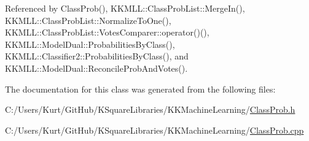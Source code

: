 Referenced by Class\+Prob(), K\+K\+M\+L\+L\+::\+Class\+Prob\+List\+::\+Merge\+In(), K\+K\+M\+L\+L\+::\+Class\+Prob\+List\+::\+Normalize\+To\+One(), K\+K\+M\+L\+L\+::\+Class\+Prob\+List\+::\+Votes\+Comparer\+::operator()(), K\+K\+M\+L\+L\+::\+Model\+Dual\+::\+Probabilities\+By\+Class(), K\+K\+M\+L\+L\+::\+Classifier2\+::\+Probabilities\+By\+Class(), and K\+K\+M\+L\+L\+::\+Model\+Dual\+::\+Reconcile\+Prob\+And\+Votes().



The documentation for this class was generated from the following files\+:\begin{DoxyCompactItemize}
\item 
C\+:/\+Users/\+Kurt/\+Git\+Hub/\+K\+Square\+Libraries/\+K\+K\+Machine\+Learning/\hyperlink{_class_prob_8h}{Class\+Prob.\+h}\item 
C\+:/\+Users/\+Kurt/\+Git\+Hub/\+K\+Square\+Libraries/\+K\+K\+Machine\+Learning/\hyperlink{_class_prob_8cpp}{Class\+Prob.\+cpp}\end{DoxyCompactItemize}
